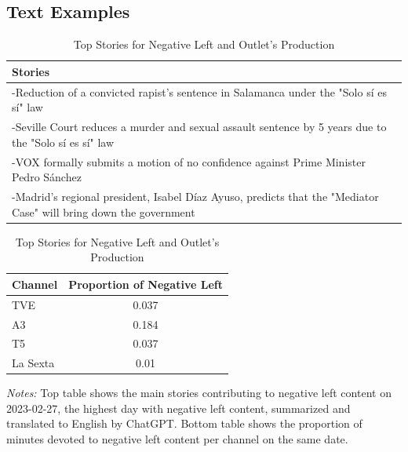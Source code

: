 \documentclass[12pt]{article}
\begin{document}
	
	
\clearpage
	\subsection{Text Examples}
	
	
	
		\begin{table}[!htb]
								\caption{Top Stories for Negative Left and Outlet's Production}
		\centering
		\begin{tabular}{p{}}
			\toprule
			\textbf{Stories}  \\
			\midrule
			-Reduction of a convicted rapist’s sentence in Salamanca under the "Solo sí es sí" law  \\
			-Seville Court reduces a murder and sexual assault sentence by 5 years due to the "Solo sí es sí" law  \\
			-VOX formally submits a motion of no confidence against Prime Minister Pedro Sánchez  \\
			-Madrid’s regional president, Isabel Díaz Ayuso, predicts that the "Mediator Case" will bring down the government  \\
			\bottomrule
		\end{tabular}
		\begin{tabular}{l c}
			\toprule
			\textbf{Channel} & \textbf{Proportion of Negative Left} \\
			\midrule
			TVE & 0.037 \\
			A3  & 0.184 \\
			T5  & 0.037 \\
			La Sexta  & 0.01 \\
			\bottomrule
		\end{tabular}
			\begin{tablenotes}
			\small
			\item \textit{Notes:} Top table shows the main stories contributing to negative left content on 2023-02-27, the highest day with negative left content,  summarized and translated to English by ChatGPT. Bottom table shows the proportion of minutes devoted to negative left content per channel on the same date.
		\end{tablenotes}
		\label{tab:neg_left_channels}
	\end{table}
	
\end{document}
